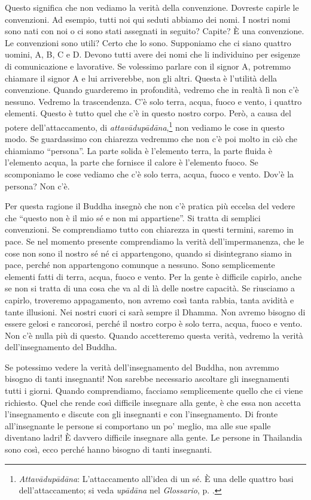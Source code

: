 Questo significa che non vediamo la verità della convenzione. Dovreste
capirle le convenzioni. Ad esempio, tutti noi qui seduti abbiamo dei
nomi. I nostri nomi sono nati con noi o ci sono stati assegnati in
seguito? Capite? È una convenzione. Le convenzioni sono utili? Certo che
lo sono. Supponiamo che ci siano quattro uomini, A, B, C e D. Devono
tutti avere dei nomi che li individuino per esigenze di comunicazione e
lavorative. Se volessimo parlare con il signor A, potremmo chiamare il
signor A e lui arriverebbe, non gli altri. Questa è l'utilità della
convenzione. Quando guarderemo in profondità, vedremo che in realtà lì
non c'è nessuno. Vedremo la trascendenza. C'è solo terra, acqua, fuoco e
vento, i quattro elementi. Questo è tutto quel che c'è in questo nostro
corpo. Però, a causa del potere dell'attaccamento, di
\emph{attavādupādāna},\footnote{\emph{Attavādupādāna}: L'attaccamento
  all'idea di un sé. È una delle quattro basi dell'attaccamento; si
  veda \emph{upādāna} nel \emph{Glossario}, p. \pageref{glossary-upadana}.} non vediamo le cose in
questo modo. Se guardassimo con chiarezza vedremmo che non c'è poi molto
in ciò che chiamiamo ``persona''. La parte solida è l'elemento terra, la
parte fluida è l'elemento acqua, la parte che fornisce il calore è
l'elemento fuoco. Se scomponiamo le cose vediamo che c'è solo terra,
acqua, fuoco e vento. Dov'è la persona? Non c'è.

Per questa ragione il Buddha insegnò che non c'è pratica più eccelsa del
vedere che ``questo non è il mio sé e non mi appartiene''. Si tratta di
semplici convenzioni. Se comprendiamo tutto con chiarezza in questi
termini, saremo in pace. Se nel momento presente comprendiamo la verità
dell'impermanenza, che le cose non sono il nostro sé né ci appartengono,
quando si disintegrano siamo in pace, perché non appartengono comunque a
nessuno. Sono semplicemente elementi fatti di terra, acqua, fuoco e
vento. Per la gente è difficile capirlo, anche se non si tratta di una
cosa che va al di là delle nostre capacità. Se riusciamo a capirlo,
troveremo appagamento, non avremo così tanta rabbia, tanta avidità e
tante illusioni. Nei nostri cuori ci sarà sempre il Dhamma. Non avremo
bisogno di essere gelosi e rancorosi, perché il nostro corpo è solo
terra, acqua, fuoco e vento. Non c'è nulla più di questo. Quando
accetteremo questa verità, vedremo la verità dell'insegnamento del
Buddha.

Se potessimo vedere la verità dell'insegnamento del Buddha, non avremmo
bisogno di tanti insegnanti! Non sarebbe necessario ascoltare gli
insegnamenti tutti i giorni. Quando comprendiamo, facciamo semplicemente
quello che ci viene richiesto. Quel che rende così difficile insegnare
alla gente, è che essa non accetta l'insegnamento e discute con gli
insegnanti e con l'insegnamento. Di fronte all'insegnante le persone si
comportano un po' meglio, ma alle sue spalle diventano ladri! È davvero
difficile insegnare alla gente. Le persone in Thailandia sono così, ecco
perché hanno bisogno di tanti insegnanti.

